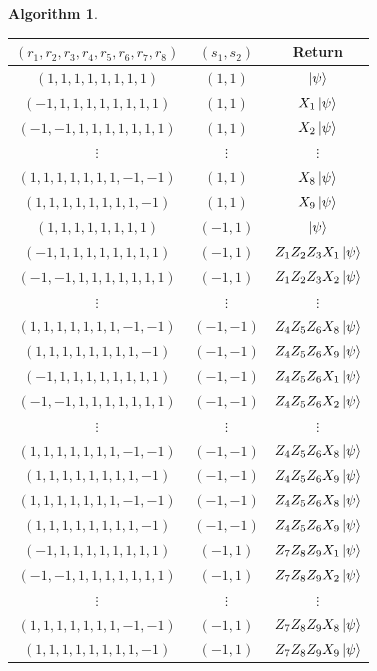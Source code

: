 \documentclass[12pt]{article}
\theoremstyle{plain}
\theoremstyle{definition}
\newtheorem{algorithm}[thm]{Algorithm}
\begin{document}
\begin{algorithm}
\begin{center}
\begin{tabular}{|c|c|c|}
\hline
$(r_1,r_2,r_3,r_4,r_5,r_6,r_7,r_8)$ & $(s_1,s_2)$ & Return\\
\hline
$(1,1,1,1,1,1,1,1)$ & $(1,1)$ & $\ket{\psi}$\\
\hline
$(-1,1,1,1,1,1,1,1,1)$ & $(1,1)$ & $X_1\ket{\psi}$\\
\hline
$(-1,-1,1,1,1,1,1,1,1)$ & $(1,1)$ & $X_2\ket{\psi}$\\
\hline
$\vdots$ & $\vdots$ & $\vdots$\\
\hline
$(1,1,1,1,1,1,1,-1,-1)$ & $(1,1)$ & $X_8\ket{\psi}$\\
\hline
$(1,1,1,1,1,1,1,1,-1)$ & $(1,1)$ & $X_9\ket{\psi}$\\
\hline
$(1,1,1,1,1,1,1,1)$ & $(-1,1)$ & $\ket{\psi}$\\
\hline
$(-1,1,1,1,1,1,1,1,1)$ & $(-1,1)$ & $Z_1Z_2Z_3X_1\ket{\psi}$\\
\hline
$(-1,-1,1,1,1,1,1,1,1)$ & $(-1,1)$ & $Z_1Z_2Z_3X_2\ket{\psi}$\\
\hline
$\vdots$ & $\vdots$ & $\vdots$\\
\hline
$(1,1,1,1,1,1,1,-1,-1)$ & $(-1,-1)$ & $Z_4Z_5Z_6X_8\ket{\psi}$\\
\hline
$(1,1,1,1,1,1,1,1,-1)$ & $(-1,-1)$ & $Z_4Z_5Z_6X_9\ket{\psi}$\\
\hline
$(-1,1,1,1,1,1,1,1,1)$ & $(-1,-1)$ & $Z_4Z_5Z_6X_1\ket{\psi}$\\
\hline
$(-1,-1,1,1,1,1,1,1,1)$ & $(-1,-1)$ & $Z_4Z_5Z_6X_2\ket{\psi}$\\
\hline
$\vdots$ & $\vdots$ & $\vdots$\\
\hline
$(1,1,1,1,1,1,1,-1,-1)$ & $(-1,-1)$ & $Z_4Z_5Z_6X_8\ket{\psi}$\\
\hline
$(1,1,1,1,1,1,1,1,-1)$ & $(-1,-1)$ & $Z_4Z_5Z_6X_9\ket{\psi}$\\
\hline
$(1,1,1,1,1,1,1,-1,-1)$ & $(-1,-1)$ & $Z_4Z_5Z_6X_8\ket{\psi}$\\
\hline
$(1,1,1,1,1,1,1,1,-1)$ & $(-1,-1)$ & $Z_4Z_5Z_6X_9\ket{\psi}$\\
\hline
$(-1,1,1,1,1,1,1,1,1)$ & $(-1,1)$ & $Z_7Z_8Z_9X_1\ket{\psi}$\\
\hline
$(-1,-1,1,1,1,1,1,1,1)$ & $(-1,1)$ & $Z_7Z_8Z_9X_2\ket{\psi}$\\
\hline
$\vdots$ & $\vdots$ & $\vdots$\\
\hline
$(1,1,1,1,1,1,1,-1,-1)$ & $(-1,1)$ & $Z_7Z_8Z_9X_8\ket{\psi}$\\
\hline
$(1,1,1,1,1,1,1,1,-1)$ & $(-1,1)$ & $Z_7Z_8Z_9X_9\ket{\psi}$\\
\hline
\end{tabular}
\end{center}
\end{algorithm}
\end{document}
